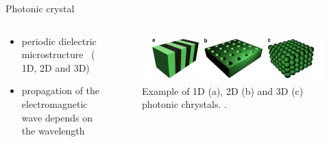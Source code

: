 \begin{frame}{Photonic crystal}
  \begin{columns}

    \begin{column}{0.49\textwidth}
    \begin{itemize}
      \setlength\itemsep{1.2em}
      \item{periodic dielectric microstructure \, ( 1D, 2D and 3D)}
      \item{propagation of the electromagnetic wave depends on the wavelength}
    \end{itemize}
    \end{column}

    \begin{column}{0.49\textwidth}
    \begin{figure}
      \centering
      \includegraphics[width=1\textwidth]{./bilder/photonic_crystal_model.png}
      \caption{Example of 1D (a), 2D (b) and 3D (c) photonic chrystals. \cite{intro_pho}.}
      \label{fig: photonic_crystal}
    \end{figure}
  \end{column}

  \end{columns}

\end{frame}

